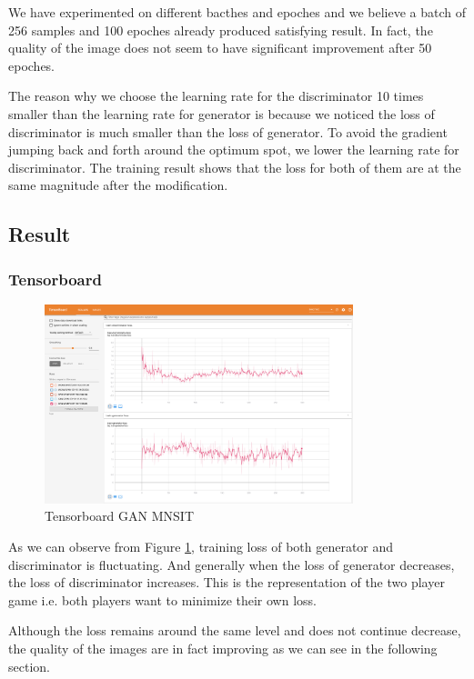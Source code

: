 \documentclass{article}
\begin{document}
We have experimented on different bacthes and epoches and we believe a batch of 256 samples and 100 epoches already produced satisfying result. 
In fact, the quality of the image does not seem to have significant improvement after 50 epoches.

The reason why we choose the learning rate for the discriminator 10 times smaller than the learning rate for generator is 
because we noticed the loss of discriminator is much smaller than the loss of generator. 
To avoid the gradient jumping back and forth around the optimum spot, we lower the learning rate for discriminator.
The training result shows that the loss for both of them are at the same magnitude after the modification.

\subsection{Result}

\subsubsection{Tensorboard}

\begin{figure}[!htb]
  \centering
  \includegraphics[width=0.8\textwidth]{imgs/tensorboard-GAN-MNIST.png}
  \caption{Tensorboard GAN MNSIT}
  \label{fig:TB_GAN_MNSIT}
\end{figure}

As we can observe from Figure \ref{fig:TB_GAN_MNSIT}, training loss of both generator and discriminator is fluctuating. 
And generally when the loss of generator decreases, the loss of discriminator increases. This is the representation of the two player game i.e. both players want to minimize their own loss.

Although the loss remains around the same level and does not continue decrease, the quality of the images are in fact improving as we can see in the following section.
\end{document}
